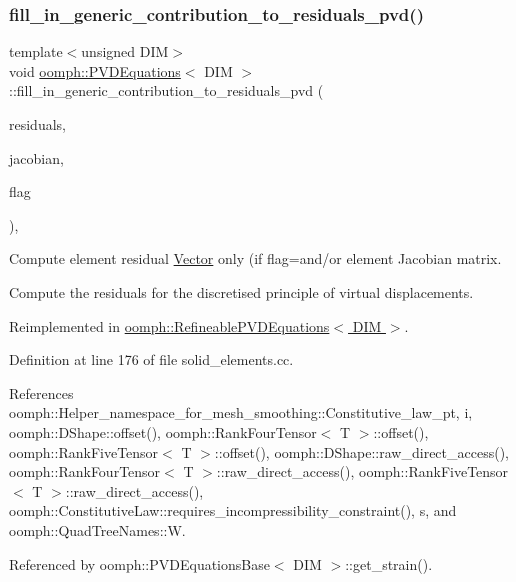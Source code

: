 \subsubsection{\texorpdfstring{fill\+\_\+in\+\_\+generic\+\_\+contribution\+\_\+to\+\_\+residuals\+\_\+pvd()}{fill\_in\_generic\_contribution\_to\_residuals\_pvd()}}
{\footnotesize\ttfamily template$<$unsigned D\+IM$>$ \\
void \hyperlink{classoomph_1_1PVDEquations}{oomph\+::\+P\+V\+D\+Equations}$<$ D\+IM $>$\+::fill\+\_\+in\+\_\+generic\+\_\+contribution\+\_\+to\+\_\+residuals\+\_\+pvd (\begin{DoxyParamCaption}\item[{\hyperlink{classoomph_1_1Vector}{Vector}$<$ double $>$ \&}]{residuals,  }\item[{\hyperlink{classoomph_1_1DenseMatrix}{Dense\+Matrix}$<$ double $>$ \&}]{jacobian,  }\item[{const unsigned \&}]{flag }\end{DoxyParamCaption})\hspace{0.3cm}{\ttfamily [protected]}, {\ttfamily [virtual]}}



Compute element residual \hyperlink{classoomph_1_1Vector}{Vector} only (if flag=and/or element Jacobian matrix. 

Compute the residuals for the discretised principle of virtual displacements. 

Reimplemented in \hyperlink{classoomph_1_1RefineablePVDEquations_ace1bda5ddd0cecac296f8b5c3a053a21}{oomph\+::\+Refineable\+P\+V\+D\+Equations$<$ D\+I\+M $>$}.



Definition at line 176 of file solid\+\_\+elements.\+cc.



References oomph\+::\+Helper\+\_\+namespace\+\_\+for\+\_\+mesh\+\_\+smoothing\+::\+Constitutive\+\_\+law\+\_\+pt, i, oomph\+::\+D\+Shape\+::offset(), oomph\+::\+Rank\+Four\+Tensor$<$ T $>$\+::offset(), oomph\+::\+Rank\+Five\+Tensor$<$ T $>$\+::offset(), oomph\+::\+D\+Shape\+::raw\+\_\+direct\+\_\+access(), oomph\+::\+Rank\+Four\+Tensor$<$ T $>$\+::raw\+\_\+direct\+\_\+access(), oomph\+::\+Rank\+Five\+Tensor$<$ T $>$\+::raw\+\_\+direct\+\_\+access(), oomph\+::\+Constitutive\+Law\+::requires\+\_\+incompressibility\+\_\+constraint(), s, and oomph\+::\+Quad\+Tree\+Names\+::W.



Referenced by oomph\+::\+P\+V\+D\+Equations\+Base$<$ D\+I\+M $>$\+::get\+\_\+strain().

